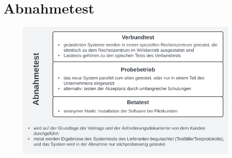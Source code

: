 \section{Abnahmetest}

\begin{figure}
    \centering
    \includegraphics[scale=0.5]{chapters/Anhang/CheatSheets/img/abnahmetest}
\end{figure}